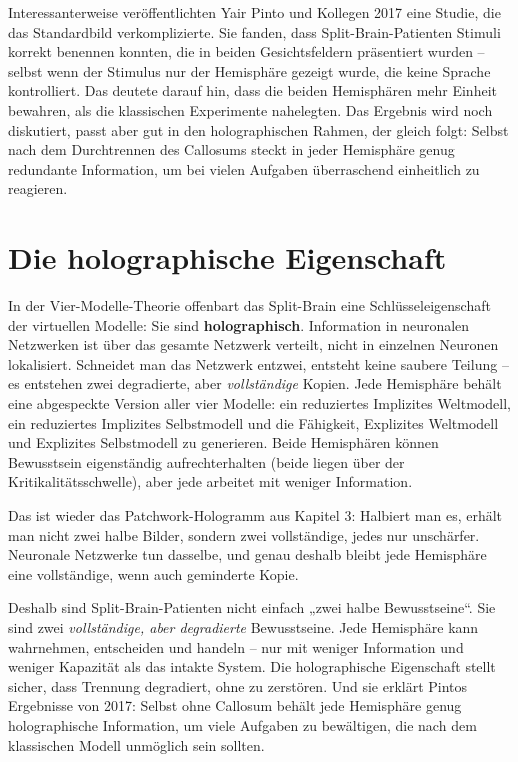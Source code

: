 \documentclass[11pt, twoside, openright]{book}
\begin{document}
Interessanterweise veröffentlichten Yair Pinto und Kollegen 2017 eine Studie, die das Standardbild verkomplizierte. Sie fanden, dass Split-Brain-Patienten Stimuli korrekt benennen konnten, die in beiden Gesichtsfeldern präsentiert wurden -- selbst wenn der Stimulus nur der Hemisphäre gezeigt wurde, die keine Sprache kontrolliert. Das deutete darauf hin, dass die beiden Hemisphären mehr Einheit bewahren, als die klassischen Experimente nahelegten. Das Ergebnis wird noch diskutiert, passt aber gut in den holographischen Rahmen, der gleich folgt: Selbst nach dem Durchtrennen des Callosums steckt in jeder Hemisphäre genug redundante Information, um bei vielen Aufgaben überraschend einheitlich zu reagieren.

\section*{Die holographische Eigenschaft}

In der Vier-Modelle-Theorie offenbart das Split-Brain eine Schlüsseleigenschaft der virtuellen Modelle: Sie sind \textbf{holographisch}. Information in neuronalen Netzwerken ist über das gesamte Netzwerk verteilt, nicht in einzelnen Neuronen lokalisiert. Schneidet man das Netzwerk entzwei, entsteht keine saubere Teilung -- es entstehen zwei degradierte, aber \textit{vollständige} Kopien. Jede Hemisphäre behält eine abgespeckte Version aller vier Modelle: ein reduziertes Implizites Weltmodell, ein reduziertes Implizites Selbstmodell und die Fähigkeit, Explizites Weltmodell und Explizites Selbstmodell zu generieren. Beide Hemisphären können Bewusstsein eigenständig aufrechterhalten (beide liegen über der Kritikalitätsschwelle), aber jede arbeitet mit weniger Information.

Das ist wieder das Patchwork-Hologramm aus Kapitel 3: Halbiert man es, erhält man nicht zwei halbe Bilder, sondern zwei vollständige, jedes nur unschärfer. Neuronale Netzwerke tun dasselbe, und genau deshalb bleibt jede Hemisphäre eine vollständige, wenn auch geminderte Kopie.

Deshalb sind Split-Brain-Patienten nicht einfach „zwei halbe Bewusstseine“. Sie sind zwei \textit{vollständige, aber degradierte} Bewusstseine. Jede Hemisphäre kann wahrnehmen, entscheiden und handeln -- nur mit weniger Information und weniger Kapazität als das intakte System. Die holographische Eigenschaft stellt sicher, dass Trennung degradiert, ohne zu zerstören. Und sie erklärt Pintos Ergebnisse von 2017: Selbst ohne Callosum behält jede Hemisphäre genug holographische Information, um viele Aufgaben zu bewältigen, die nach dem klassischen Modell unmöglich sein sollten.
\end{document}

